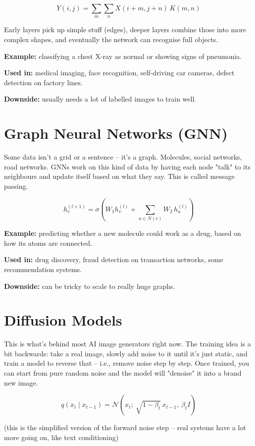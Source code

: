\documentclass[11pt]{article}
\begin{document}
\[
Y(i,j) = \sum_{m}\sum_{n} X(i+m, j+n)\, K(m,n)
\]

Early layers pick up simple stuff (edges), deeper layers combine those into more complex shapes, and eventually the network can recognise full objects.

\textbf{Example:} classifying a chest X-ray as normal or showing signs of pneumonia.

\textbf{Used in:} medical imaging, face recognition, self-driving car cameras, defect detection on factory lines.

\textbf{Downside:} usually needs a lot of labelled images to train well.

\section{Graph Neural Networks (GNN)}

Some data isn't a grid or a sentence -- it's a graph. Molecules, social networks, road networks. GNNs work on this kind of data by having each node "talk" to its neighbours and update itself based on what they say. This is called message passing.

\[
h_v^{(l+1)} = \sigma\!\left(W_1 h_v^{(l)} + \sum_{u \in N(v)} W_2\, h_u^{(l)}\right)
\]

\textbf{Example:} predicting whether a new molecule could work as a drug, based on how its atoms are connected.

\textbf{Used in:} drug discovery, fraud detection on transaction networks, some recommendation systems.

\textbf{Downside:} can be tricky to scale to really huge graphs.

\section{Diffusion Models}

This is what's behind most AI image generators right now. The training idea is a bit backwards: take a real image, slowly add noise to it until it's just static, and train a model to reverse that -- i.e., remove noise step by step. Once trained, you can start from pure random noise and the model will "denoise" it into a brand new image.

\[
q(x_t \mid x_{t-1}) = \mathcal{N}\!\left(x_t;\ \sqrt{1-\beta_t}\,x_{t-1},\ \beta_t I\right)
\]

(this is the simplified version of the forward noise step -- real systems have a lot more going on, like text conditioning)
\end{document}
